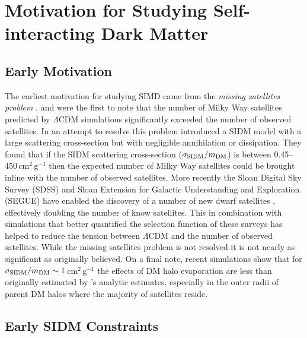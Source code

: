 \section{Motivation for Studying Self-interacting Dark Matter}



\subsection{Early Motivation}

The earliest motivation for studying SIMD came from the \textit{missing satellites problem} \citep[see][for a thorough review]{Bullock:2010uv}.
\citet{Moore:1999ja} and \citet{Klypin:1999ej} were the first to note that the number of Milky Way satellites predicted by $\Lambda$CDM simulations significantly exceeded the number of observed satellites.
In an attempt to resolve this problem \citet{Spergel:2000cb} introduced a SIDM model with a large scattering cross-section but with negligible annihilation or dissipation. 
They found that if the SIDM scattering cross-section ($\sigma_{\rm SIDM}/m_{\rm DM}$) is between 0.45--450\,cm$^2$\,g$^{-1}$ then the expected number of Milky Way satellites could be brought inline with the number of observed satellites.
More recently the Sloan Digital Sky Survey (SDSS) and Sloan Extension for Galactic Understanding and Exploration (SEGUE) have enabled the discovery of a number of new dwarf satellites \citep[see][for a review]{Willman:2010fg}, effectively doubling the number of know satellites.
This in combination with simulations that better quantified the selection function of these surveys has helped to reduce the tension between $\Lambda$CDM and the number of observed satellites.
While the missing satellites problem is not resolved it is not nearly as significant as originally believed.
On a final note, recent simulations \citep{Rocha:2012tr} show that for $\sigma_{\rm SIDM}/m_{\rm DM} \sim 1$\,cm$^2$\,g$^{-1}$ the effects of DM halo evaporation are less than originally estimated by \citet{Spergel:2000cb}'s analytic estimates, especially in the outer radii of parent DM halos where the majority of satellites reside.

\subsection{Early SIDM Constraints}

